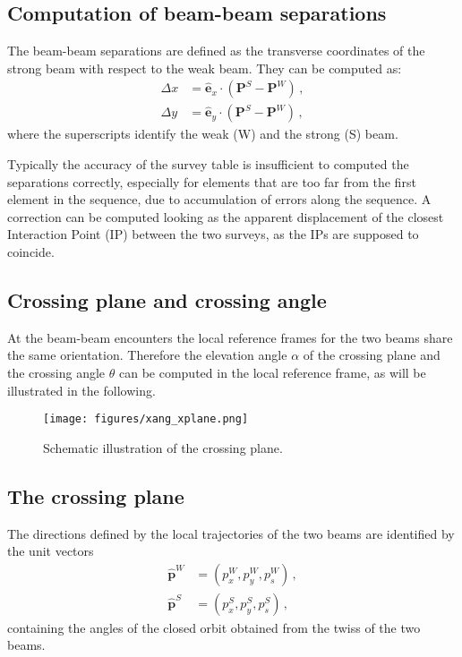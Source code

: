 \subsection{Computation of beam-beam separations}
\label{sec:separ}

The beam-beam separations are defined as the transverse coordinates of the strong beam with respect to the weak beam. They can be computed as:
\begin{align}
    \Delta x &= \hat{\textbf{e}}_x \cdot \left( \textbf{P}^S -  \textbf{P}^W \right) \, ,\\
    \Delta y &= \hat{\textbf{e}}_y \cdot \left( \textbf{P}^S -  \textbf{P}^W \right) \, ,
\end{align}
where the superscripts identify the weak (W) and the strong (S) beam.

Typically the accuracy of the survey table is insufficient to computed the separations correctly, especially for elements that are too far from the first element in the sequence, due to accumulation of errors along the sequence. A correction can be computed looking as the apparent displacement of the closest Interaction Point (IP) between the two surveys, as the IPs are supposed to coincide.

\subsection{Crossing plane and crossing angle}
\label{sec:xing}

At the beam-beam encounters the local reference frames for the two beams share the same orientation. Therefore the elevation angle $\alpha$ of the crossing plane  and the crossing angle $\theta$ can be computed in the local reference frame, as will be illustrated in the following.

\begin{figure}[t]
\centering
\texttt{[image: figures/xang\_xplane.png]}
\caption{\small Schematic illustration of the crossing plane. \label{fig:xing}}
\end{figure}

\subsection{The crossing plane}

The directions defined by the local trajectories of the two beams are identified by the unit vectors
\begin{align}
\hat{\textbf{p}}^W &= \left(p^W_x, p^W_y, p^W_s\right) \, ,\\
\hat{\textbf{p}}^S &= \left(p^S_x, p^S_y, p^S_s\right) \, ,\
\end{align}
containing the angles of the closed orbit obtained from the twiss of the two beams.

